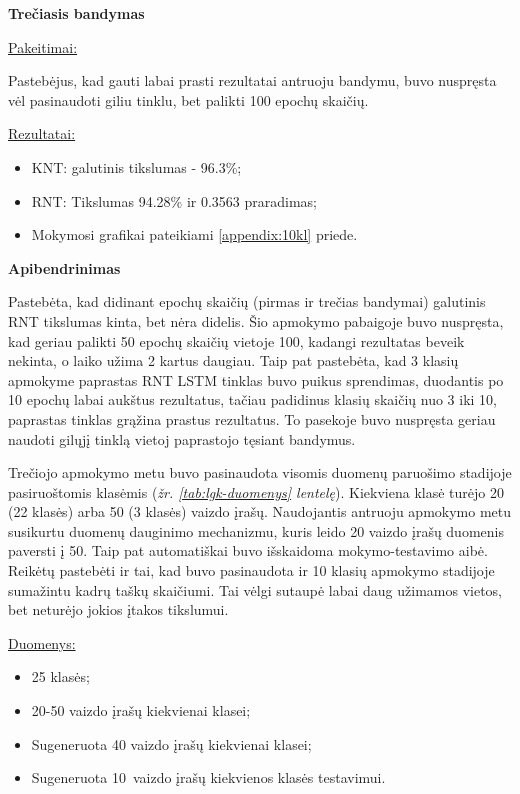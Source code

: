 \documentclass{VUMIFPSbakalaurinis}
\begin{document}
\bigbreak
\textbf{Trečiasis bandymas}

\underline{Pakeitimai:}

Pastebėjus, kad gauti labai prasti rezultatai antruoju bandymu, buvo nuspręsta vėl pasinaudoti giliu tinklu, bet palikti 100 epochų skaičių.

\underline{Rezultatai:}
\begin{itemize}
	\item KNT: galutinis tikslumas - 96.3\%;
	\item RNT: Tikslumas 94.28\% ir 0.3563 praradimas;
	\item Mokymosi grafikai pateikiami \ref{appendix:10kl} priede.
\end{itemize}

\bigbreak
\textbf{Apibendrinimas}

Pastebėta, kad didinant epochų skaičių (pirmas ir trečias bandymai) galutinis RNT tikslumas kinta, bet nėra didelis. Šio apmokymo pabaigoje buvo nuspręsta, kad geriau palikti 50 epochų skaičių vietoje 100, kadangi rezultatas beveik nekinta, o laiko užima 2 kartus daugiau. Taip pat pastebėta, kad 3 klasių apmokyme paprastas RNT LSTM tinklas buvo puikus sprendimas, duodantis po 10 epochų labai aukštus rezultatus, tačiau padidinus klasių skaičių nuo 3 iki 10, paprastas tinklas grąžina prastus rezultatus. To pasekoje buvo nuspręsta geriau naudoti gilųjį tinklą vietoj paprastojo tęsiant bandymus.


Trečiojo apmokymo metu buvo pasinaudota visomis duomenų paruošimo stadijoje pasiruoštomis klasėmis (\textit{žr. \ref{tab:lgk-duomenys} lentelę}).  Kiekviena klasė turėjo 20 (22 klasės) arba 50 (3 klasės) vaizdo įrašų. Naudojantis antruoju apmokymo metu susikurtu duomenų dauginimo mechanizmu, kuris leido 20 vaizdo įrašų duomenis paversti į 50. Taip pat automatiškai buvo išskaidoma mokymo-testavimo aibė. Reikėtų pastebėti ir tai, kad buvo pasinaudota ir 10 klasių apmokymo stadijoje sumažintu kadrų taškų skaičiumi. Tai vėlgi sutaupė labai daug užimamos vietos, bet neturėjo jokios įtakos tikslumui.

\underline{Duomenys:}

\begin{itemize}
	\item 25 klasės;
	\item 20-50 vaizdo įrašų kiekvienai klasei;
	\item Sugeneruota 40 vaizdo įrašų kiekvienai klasei;
	\item Sugeneruota 10 vaizdo įrašų kiekvienos klasės testavimui.
\end{itemize}
\end{document}
